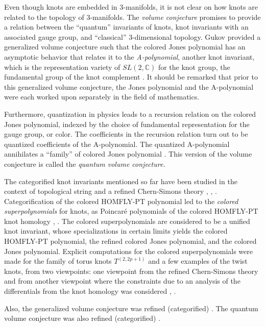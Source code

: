 \documentclass[a4paper,titlepage,twoside]{book}
\begin{document}
Even though knots are embedded in 3-manifolds, it is not clear on how knots are related to the topology of 3-manifolds.  The \emph{volume conjecture} promises to provide a relation between the ``quantum'' invariants of knots, knot invariants with an associated gauge group, and ``classical'' 3-dimensional topology.  Gukov provided a generalized volume conjecture such that the colored Jones polynomial has an asymptotic behavior that relates it to the \emph{A-polynomial}, another knot invariant, which is the representation variety of $SL{ (2,\mathbb{C})}$ for the knot group, the fundamental group of the knot complement \cite{Gukov2005}.  It should be remarked that prior to this generalized volume conjecture, the Jones polynomial and the A-polynomial were each worked upon separately in the field of mathematics.  

Furthermore, quantization in physics leads to a recursion relation on the colored Jones polynomial, indexed by the choice of fundamental representation for the gauge group, or color.  The coefficients in the recursion relation turn out to be quantized coefficients of the A-polynomial.  The quantized A-polynomial annihilates a ``family'' of colored Jones polynomial \cite{Gukov2005}.  This version of the volume conjecture is called the \emph{quantum volume conjecture.}

The categorified knot invariants mentioned so far have been studied in the context of topological string and a refined Chern-Simons theory \cite{GukovSchwarzVafa2005}, \cite{AganagicShakirov2012}, \cite{bib:AS2012}.  Categorification of the colored HOMFLY-PT polynomial led to the \emph{colored superpolynomials} for knots, as Poincar\'{e} polynomials of the colored HOMFLY-PT knot homology \cite{bib:KR2008}, \cite{DunfieldGukovRasmussen2005}.  The colored superpolynomials are considered to be a unified knot invariant, whose specializations in certain limits yields the colored HOMFLY-PT polynomial, the refined colored Jones polynomial, and the colored Jones polynomial.  Explicit computations for the colored superpolynomials were made for the family of torus knots $T^{(2,2p+1)}$ and a few examples of the twist knots, from two viewpoints: one viewpoint from the refined Chern-Simons theory and from another viewpoint where the constraints due to an analysis of the differentials from the knot homology was considered \cite{FujiGukovSulkowski2012}, \cite{GukovStosic2012}.  

Also, the generalized volume conjecture was refined (categorified) \cite{FujiGukovSulkowski2012}.  The quantum volume conjecture was also refined (categorified) \cite{FujiGukovSulkowski2012}.  
\end{document}
